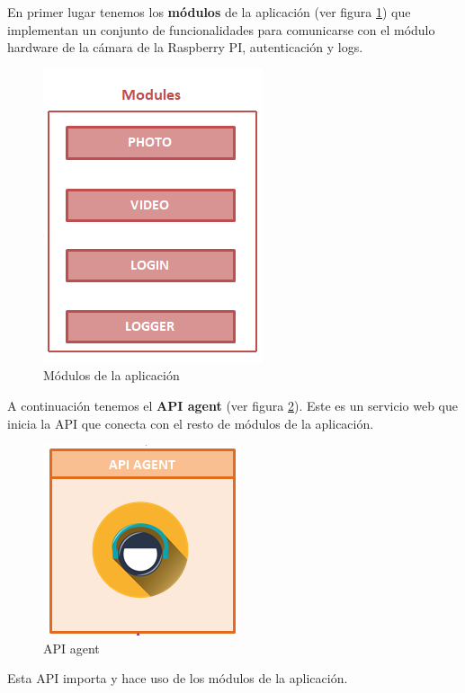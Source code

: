 En primer lugar tenemos los \textbf{módulos} de la aplicación (ver figura \ref{img:modulos}) que implementan un conjunto de funcionalidades para comunicarse con el módulo hardware de la cámara de la Raspberry PI, autenticación y logs.

\begin{figure}[h]
	\centering
	\includegraphics[scale=0.4]{images/24}
	\caption{Módulos de la aplicación}
	\label{img:modulos}
\end{figure}

A continuación tenemos el \textbf{API agent} (ver figura \ref{img:api}). Este es un servicio web que inicia la API que conecta con el resto de módulos de la aplicación.

\begin{figure}[h]
	\centering
	\includegraphics[scale=0.35]{images/25}
	\caption{API agent}
	\label{img:api}
\end{figure}

\newpage

Esta API importa y hace uso de los módulos de la aplicación. 

